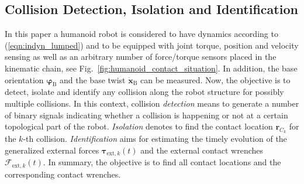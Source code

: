 \subsection{Collision Detection, Isolation and Identification}
%
In this paper a humanoid robot is considered to have dynamics according to (\ref{eqn:indyn_lumped}) and to be equipped with joint torque, position and velocity sensing as well as an arbitrary number of force/torque sensors placed in the kinematic chain, see Fig.~\ref{fig:humanoid_contact_situation}.
In addition, the base orientation $\bm{\varphi}_\mathrm{B}$ and the base twist $\dot{\bm{x}}_\mathrm{B}$ can be measured.
Now, the objective is to detect, isolate and identify any collision along the robot structure for possibly multiple collisions.
In this context, collision \emph{detection} means to generate a number of binary signals indicating whether a collision is happening or not at a certain topological part of the robot.
\emph{Isolation} denotes to find the contact location $\bm{r}_{C_k}$ for the $k$-th collision.
\emph{Identification} aims for estimating the timely evolution of the generalized external forces $\bm{\tau}_{\mathrm{ext},k}(t)$ and the external contact wrenches $\bm{\mathcal{F}}_{\mathrm{ext},k}(t)$.
In summary, the objective is to find all contact locations and the corresponding contact wrenches.
%
